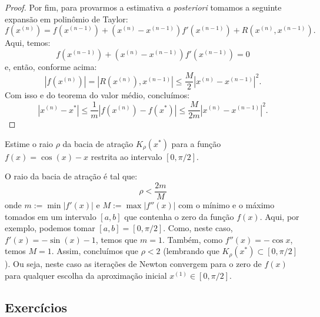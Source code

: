 \begin{proof}
Por fim, para provarmos a estimativa \emph{a posteriori} tomamos a seguinte expansão em polinômio de Taylor:
\begin{equation*}
  f(x^{(n)}) = f(x^{(n-1)}) + (x^{(n)} - x^{(n-1)})f'(x^{(n-1)}) + R(x^{(n)},x^{(n-1)}).
\end{equation*}
Aqui, temos:
\begin{equation*}
  f(x^{(n-1)}) + (x^{(n)} - x^{(n-1)})f'(x^{(n-1)}) = 0
\end{equation*}
e, então, conforme acima:
\begin{equation*}
  |f(x^{(n)})| = |R(x^{(n)}),x^{(n-1)}| \leq \frac{M}{2}|x^{(n)} - x^{(n-1)}|^2.
\end{equation*}
Com isso e do teorema do valor médio, concluímos:
\begin{equation*}
  |x^{(n)} - x^*| \leq \frac{1}{m}|f(x^{(n)}) - f(x^*)| \leq \frac{M}{2m}|x^{(n)} - x^{(n-1)}|^2.
\end{equation*}
\end{proof}

\begin{ex}
  Estime o raio $\rho$ da bacia de atração $K_\rho(x^*)$ para a função $f(x) = \cos(x) - x$ restrita ao intervalo $[0, \pi/2]$.
\end{ex}
\begin{sol}
  O raio da bacia de atração é tal que:
  \begin{equation*}
    \rho < \frac{2m}{M}
  \end{equation*}
onde $m := \min |f'(x)|$ e $M := \max |f''(x)|$ com o mínimo e o máximo tomados em um intervalo $[a, b]$ que contenha o zero da função $f(x)$. Aqui, por exemplo, podemos tomar $[a, b] = [0, \pi/2]$. Como, neste caso, $f'(x) = -\sin(x) - 1$, temos que $m = 1$. Também, como $f''(x) = -\cos x$, temos $M = 1$. Assim, concluímos que $\rho < 2$ (lembrando que $K_\rho(x^*)\subset [0, \pi/2]$). Ou seja, neste caso as iterações de Newton convergem para o zero de $f(x)$ para qualquer escolha da aproximação inicial $x^{(1)}\in [0, \pi/2]$.
\end{sol}

\subsection*{Exercícios}

